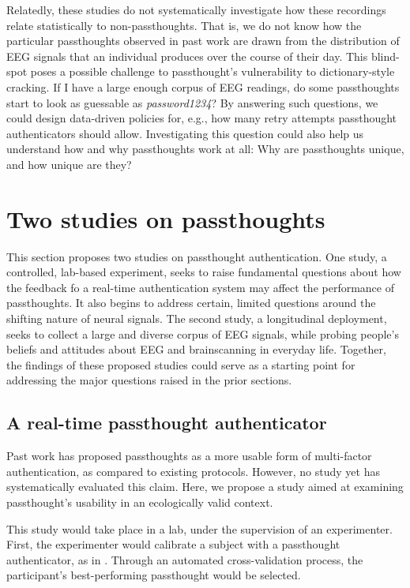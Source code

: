 \documentclass[sigconf]{acmart}
\begin{document}
Relatedly, these studies do not systematically investigate how these recordings relate statistically to non-passthoughts.
That is, we do not know how the particular passthoughts observed in past work are drawn from the distribution of EEG signals that an individual produces over the course of their day.
This blind-spot poses a possible challenge to passthought's vulnerability to dictionary-style cracking.
If I have a large enough corpus of EEG readings, do some passthoughts start to look as guessable as \emph{password1234}?
By answering such questions, we could design data-driven policies for, e.g., how many retry attempts passthought authenticators should allow.
Investigating this question could also help us understand how and why passthoughts work at all: Why are passthoughts unique, and how unique are they?

\section{Two studies on passthoughts}
\label{sec:org31b107a}

This section proposes two studies on passthought authentication.
One study, a controlled, lab-based experiment, seeks to raise fundamental questions about how the feedback fo a real-time authentication system may affect the performance of passthoughts.
It also begins to address certain, limited questions around the shifting nature of neural signals.
The second study, a longitudinal deployment, seeks to collect a large and diverse corpus of EEG signals, while probing people's beliefs and attitudes about EEG and brainscanning in everyday life.
Together, the findings of these proposed studies could serve as a starting point for addressing the major questions raised in the prior sections.

\subsection{A real-time passthought authenticator}
\label{sec:orgf895ad6}

Past work has proposed passthoughts as a more usable form of multi-factor authentication,
as compared to existing protocols.
However, no study yet has systematically evaluated this claim.
Here, we propose a study aimed at 
examining passthought's usability in an ecologically valid context.

This study would take place in a lab, under the supervision of an experimenter.
First, the experimenter would calibrate a subject with a passthought authenticator, as in \cite{Chuang2013b}.
Through an automated cross-validation process, the participant's best-performing passthought would be selected.
\end{document}
